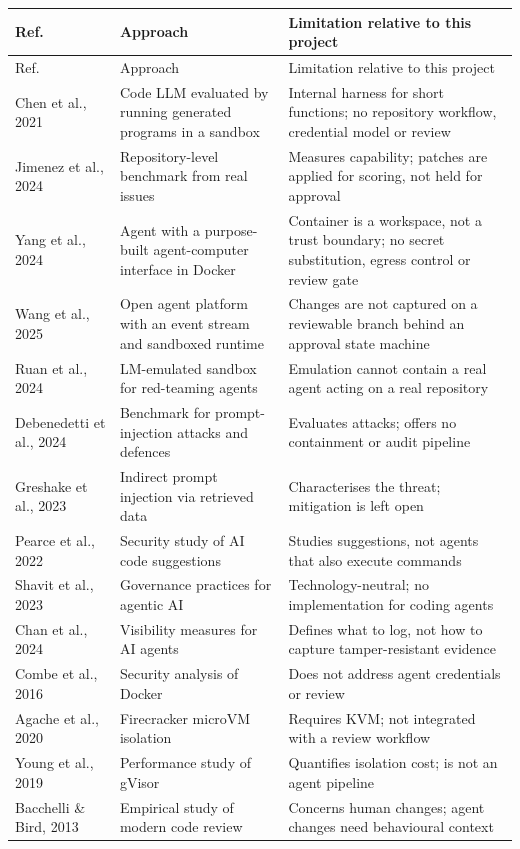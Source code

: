 \documentclass[12pt,a4paper,oneside]{report}
\providecommand{\real}[1]{#1}
\begin{document}
\begin{longtable}[]{@{}|
  >{\raggedright\arraybackslash}p{(\columnwidth - 7\tabcolsep) * \real{0.2200}} |
  >{\raggedright\arraybackslash}p{(\columnwidth - 7\tabcolsep) * \real{0.3400}} |
  >{\raggedright\arraybackslash}p{(\columnwidth - 7\tabcolsep) * \real{0.4400}}|@{}}
\hline
Ref. & Approach & Limitation relative to this project \\
\hline
\endfirsthead
\hline
Ref. & Approach & Limitation relative to this project \\
\hline
\endhead
\endlastfoot
\cite{ref1} Chen et al., 2021 & Code LLM evaluated by running generated programs in a sandbox & Internal harness for short functions; no repository workflow, credential model or review \\\hline
\cite{ref2} Jimenez et al., 2024 & Repository-level benchmark from real issues & Measures capability; patches are applied for scoring, not held for approval \\\hline
\cite{ref3} Yang et al., 2024 & Agent with a purpose-built agent-computer interface in Docker & Container is a workspace, not a trust boundary; no secret substitution, egress control or review gate \\\hline
\cite{ref4} Wang et al., 2025 & Open agent platform with an event stream and sandboxed runtime & Changes are not captured on a reviewable branch behind an approval state machine \\\hline
\cite{ref5} Ruan et al., 2024 & LM-emulated sandbox for red-teaming agents & Emulation cannot contain a real agent acting on a real repository \\\hline
\cite{ref6} Debenedetti et al., 2024 & Benchmark for prompt-injection attacks and defences & Evaluates attacks; offers no containment or audit pipeline \\\hline
\cite{ref7} Greshake et al., 2023 & Indirect prompt injection via retrieved data & Characterises the threat; mitigation is left open \\\hline
\cite{ref8} Pearce et al., 2022 & Security study of AI code suggestions & Studies suggestions, not agents that also execute commands \\\hline
\cite{ref9} Shavit et al., 2023 & Governance practices for agentic AI & Technology-neutral; no implementation for coding agents \\\hline
\cite{ref10} Chan et al., 2024 & Visibility measures for AI agents & Defines what to log, not how to capture tamper-resistant evidence \\\hline
\cite{ref11} Combe et al., 2016 & Security analysis of Docker & Does not address agent credentials or review \\\hline
\cite{ref12} Agache et al., 2020 & Firecracker microVM isolation & Requires KVM; not integrated with a review workflow \\\hline
\cite{ref13} Young et al., 2019 & Performance study of gVisor & Quantifies isolation cost; is not an agent pipeline \\\hline
\cite{ref14} Bacchelli \& Bird, 2013 & Empirical study of modern code review & Concerns human changes; agent changes need behavioural context \\\hline\end{longtable}
\end{document}
